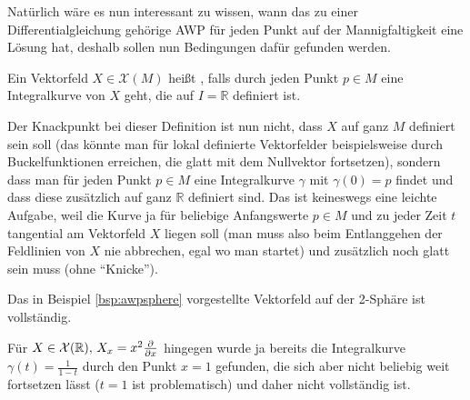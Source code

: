 \documentclass[../H_Analysis_main.tex]{subfiles}
\begin{document}
Natürlich wäre es nun interessant zu wissen, wann das zu einer Differentialgleichung gehörige AWP für jeden Punkt auf der Mannigfaltigkeit eine Lösung hat, deshalb sollen nun Bedingungen dafür gefunden werden.

\begin{defi}
Ein Vektorfeld $X \in \mathcal{X}(M)$ heißt , falls durch jeden Punkt $p \in M$ eine Integralkurve von $X$ geht, die auf $I = \mathbb{R}$ definiert ist.
\end{defi}
Der Knackpunkt bei dieser Definition ist nun nicht, dass $X$ auf ganz $M$ definiert sein soll (das könnte man für lokal definierte Vektorfelder beispielsweise durch Buckelfunktionen erreichen, die glatt mit dem Nullvektor fortsetzen), sondern dass man für jeden Punkt $p \in M$ eine Integralkurve $\gamma$ mit $\gamma(0) = p$ findet und dass diese zusätzlich auf ganz $\mathbb{R}$ definiert sind. Das ist keineswegs eine leichte Aufgabe, weil die Kurve ja für beliebige Anfangswerte $p \in M$ und zu jeder Zeit $t$ tangential am Vektorfeld $X$ liegen soll (man muss also beim Entlanggehen der Feldlinien von $X$ nie abbrechen, egal wo man startet) und zusätzlich noch glatt sein muss (ohne \enquote{Knicke}).

\begin{bsp}
Das in Beispiel \ref{bsp:awpsphere} vorgestellte Vektorfeld auf der 2-Sphäre ist vollständig.

Für $X \in \mathcal{X}(\mathbb{R}), \, X_x = x^2 \pdv{x}$ hingegen wurde ja bereits die Integralkurve $\gamma(t) = \frac{1}{1 - t}$ durch den Punkt $x = 1$ gefunden, die sich aber nicht beliebig weit fortsetzen lässt ($t = 1$ ist problematisch) und daher nicht vollständig ist.
\end{bsp}
\end{document}
